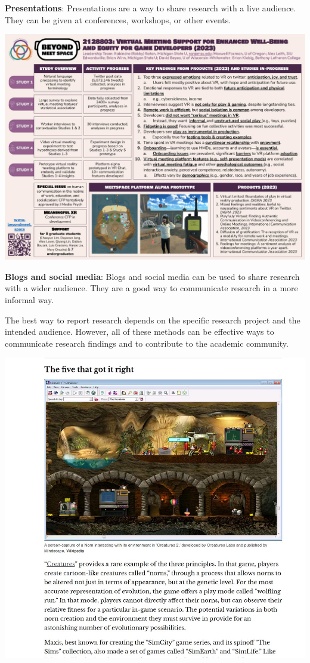 \documentclass[
]{book}
\begin{document}
\textbf{Presentations}: Presentations are a way to share research with a live audience. They can be given at conferences, workshops, or other events.

\includegraphics[width=1\linewidth,height=\textheight,keepaspectratio]{images/BMS 2023 poster final.jpg}

\textbf{Blogs and social media}: Blogs and social media can be used to share research with a wider audience. They are a good way to communicate research in a more informal way.

The best way to report research depends on the specific research project and the intended audience. However, all of these methods can be effective ways to communicate research findings and to contribute to the academic community.

\includegraphics[width=1\linewidth,height=\textheight,keepaspectratio]{images/fig091.jpg}
\end{document}
